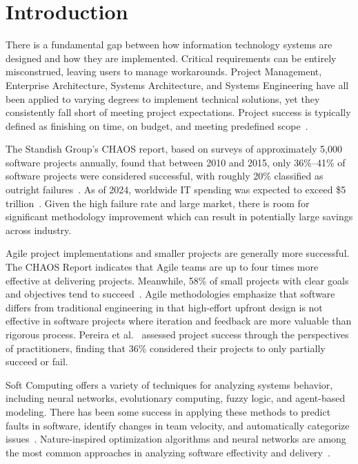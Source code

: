 \documentclass[preprint,12pt]{elsarticle}
\begin{document}
\section{Introduction}

There is a fundamental gap between how information technology systems are designed and how they are implemented. Critical requirements can be entirely misconstrued, leaving users to manage workarounds. Project Management, Enterprise Architecture, Systems Architecture, and Systems Engineering have all been applied to varying degrees to implement technical solutions, yet they consistently fall short of meeting project expectations. Project success is typically defined as finishing on time, on budget, and meeting predefined scope~\cite{loureiro2024}.

The Standish Group's CHAOS report, based on surveys of approximately 5,000 software projects annually, found that between 2010 and 2015, only 36\%--41\% of software projects were considered successful, with roughly 20\% classified as outright failures~\cite{standish2015}. As of 2024, worldwide IT spending was expected to exceed \$5 trillion~\cite{gartner2024}. Given the high failure rate and large market, there is room for significant methodology improvement which can result in potentially large savings across industry. 

Agile project implementations and smaller projects are generally more successful. The CHAOS Report indicates that Agile teams are up to four times more effective at delivering projects. Meanwhile, 58\% of small projects with clear goals and objectives tend to succeed~\cite{sandle2020}. Agile methodologies emphasize that software differs from traditional engineering in that high-effort upfront design is not effective in software projects where iteration and feedback are more valuable than rigorous process. Pereira et al.~\cite{pereira2021} assessed project success through the perspectives of practitioners, finding that 36\% considered their projects to only partially succeed or fail.

Soft Computing offers a variety of techniques for analyzing systems behavior, including neural networks, evolutionary computing, fuzzy logic, and agent-based modeling. There has been some success in applying these methods to predict faults in software, identify changes in team velocity, and automatically categorize issues~\cite{afzal2011, mahdi2021, pospieszny2018, petkovic2016, zhang2003}. Nature-inspired optimization algorithms and neural networks are among the most common approaches in analyzing software effectivity and delivery~\cite{mahajan2022, siva2023a, sarro2021, siva2023b}.
\end{document}
